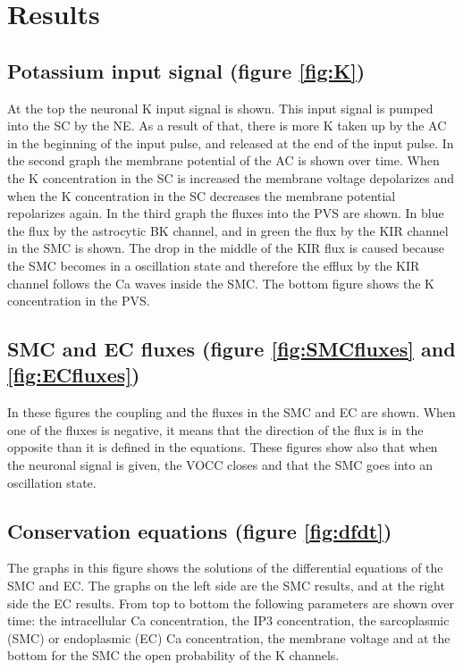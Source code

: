  \section{Results}

\subsection*{Potassium input signal (figure \ref{fig:K})}
At the top the neuronal \gls{K} input signal is shown. This input signal is pumped into the SC by the \gls{NE}. As a result of that, there is more \gls{K} taken up by the \gls{AC} in the beginning of the input pulse, and released at the end of the input pulse. In the second graph the membrane potential of the AC is shown over time. When the \gls{K} concentration in the SC is increased the membrane voltage depolarizes and when the \gls{K} concentration in the SC decreases the membrane potential repolarizes again.
In the third graph the fluxes into the PVS are shown. In blue the flux by the astrocytic BK channel, and in green the flux by the KIR channel in the SMC is shown. The drop in the middle of the KIR flux is caused because the SMC becomes in a oscillation state and therefore the efflux by the KIR channel follows the \gls{Ca} waves inside the SMC.
The bottom figure shows the \gls{K} concentration in the PVS.

\subsection*{SMC and EC fluxes (figure \ref{fig:SMCfluxes} and \ref{fig:ECfluxes})}
In these figures the coupling and the fluxes in the SMC and EC are shown. When one of the fluxes is negative, it means that the direction of the flux is in the opposite than it is defined in the equations. These figures show also that when the neuronal signal is given, the VOCC closes and that the SMC goes into an oscillation state. 

\subsection*{Conservation equations (figure \ref{fig:dfdt})}
The graphs in this figure shows the solutions of the differential equations of the \gls{SMC} and \gls{EC}. The graphs on the left side are the SMC results, and at the right side the EC results. From top to bottom the following parameters are shown over time: the intracellular \gls{Ca} concentration, the \gls{IP3} concentration, the sarcoplasmic (\gls{SMC}) or endoplasmic (\gls{EC}) \gls{Ca} concentration, the membrane voltage and at the bottom for the SMC the open probability of the \gls{K} channels.

